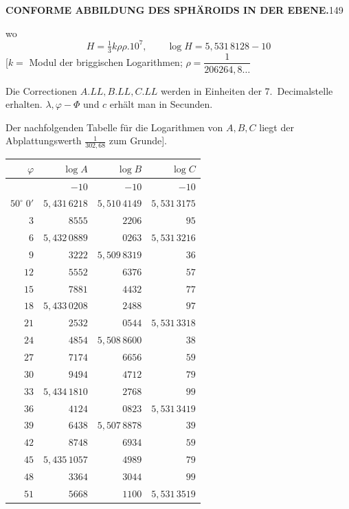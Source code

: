 \par\clearpage
\noindent\null\hfill{\small\textbf{CONFORME ABBILDUNG DES SPHÄROIDS IN DER EBENE.}}\hfill149\par\medskip
\noindent wo
\[H=\tfrac13k\rho\rho.10^7,\qquad\log H=5{,}531\,8128-10\]
[\(k=\) Modul der briggischen Logarithmen; \(\rho=\dfrac1{206264{,}8\ldots}\)

Die Correctionen \(A.LL,B.LL,C.LL\) werden in Einheiten der 7.~Decimalstelle erhalten. \(\lambda,\varphi-\Phi\) und \(c\) erhält man in Secunden.

Der nachfolgenden Tabelle für die Logarithmen von \(A,B,C\) liegt der Abplattungswerth \(\frac1{302{,}68}\) zum Grunde].
\begin{center}
\begingroup\scriptsize\setlength{\tabcolsep}{2pt}\renewcommand{\arraystretch}{1.15}
\begin{tabular}[t]{|r|r|r|r|}\hline
\(\varphi\)&\(\log A\)&\(\log B\)&\(\log C\)\\\hline\hline
&\(-10\)&\(-10\)&\(-10\)\\
\(50^\circ\;0'\)&\(5{,}431\,6218\)&\(5{,}510\,4149\)&\(5{,}531\,3175\)\\
\(3\)&\(8555\)&\(2206\)&\(95\)\\
\(6\)&\(5{,}432\,0889\)&\(0263\)&\(5{,}531\,3216\)\\
\(9\)&\(3222\)&\(5{,}509\,8319\)&\(36\)\\
\(12\)&\(5552\)&\(6376\)&\(57\)\\
\(15\)&\(7881\)&\(4432\)&\(77\)\\
\hline
\(18\)&\(5{,}433\,0208\)&\(2488\)&\(97\)\\
\(21\)&\(2532\)&\(0544\)&\(5{,}531\,3318\)\\
\(24\)&\(4854\)&\(5{,}508\,8600\)&\(38\)\\
\(27\)&\(7174\)&\(6656\)&\(59\)\\
\(30\)&\(9494\)&\(4712\)&\(79\)\\
\hline
\(33\)&\(5{,}434\,1810\)&\(2768\)&\(99\)\\
\(36\)&\(4124\)&\(0823\)&\(5{,}531\,3419\)\\
\(39\)&\(6438\)&\(5{,}507\,8878\)&\(39\)\\
\(42\)&\(8748\)&\(6934\)&\(59\)\\
\(45\)&\(5{,}435\,1057\)&\(4989\)&\(79\)\\
\hline
\(48\)&\(3364\)&\(3044\)&\(99\)\\
\(51\)&\(5668\)&\(1100\)&\(5{,}531\,3519\)\\

\end{tabular}
\end{center}
